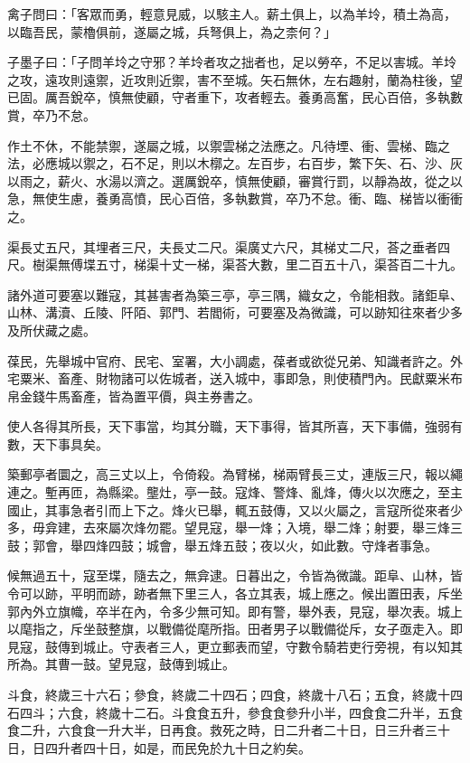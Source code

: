 
\begin{pinyinscope}
禽子問曰：「客眾而勇，輕意見威，以駭主人。薪土俱上，以為羊坽，積土為高，以臨吾民，蒙櫓俱前，遂屬之城，兵弩俱上，為之柰何？」

子墨子曰：「子問羊坽之守邪？羊坽者攻之拙者也，足以勞卒，不足以害城。羊坽之攻，遠攻則遠禦，近攻則近禦，害不至城。矢石無休，左右趣射，蘭為柱後，望已固。厲吾銳卒，慎無使顧，守者重下，攻者輕去。養勇高奮，民心百倍，多執數賞，卒乃不怠。

作土不休，不能禁禦，遂屬之城，以禦雲梯之法應之。凡待堙、衝、雲梯、臨之法，必應城以禦之，石不足，則以木槨之。左百步，右百步，繁下矢、石、沙、灰以雨之，薪火、水湯以濟之。選厲銳卒，慎無使顧，審賞行罰，以靜為故，從之以急，無使生慮，養勇高憤，民心百倍，多執數賞，卒乃不怠。衝、臨、梯皆以衝衝之。

渠長丈五尺，其埋者三尺，夫長丈二尺。渠廣丈六尺，其梯丈二尺，荅之垂者四尺。樹渠無傅堞五寸，梯渠十丈一梯，渠荅大數，里二百五十八，渠荅百二十九。

諸外道可要塞以難寇，其甚害者為築三亭，亭三隅，織女之，令能相救。諸鉅阜、山林、溝瀆、丘陵、阡陌、郭門、若閻術，可要塞及為微識，可以跡知往來者少多及所伏藏之處。

葆民，先舉城中官府、民宅、室署，大小調處，葆者或欲從兄弟、知識者許之。外宅粟米、畜產、財物諸可以佐城者，送入城中，事即急，則使積門內。民獻粟米布帛金錢牛馬畜產，皆為置平價，與主券書之。

使人各得其所長，天下事當，均其分職，天下事得，皆其所喜，天下事備，強弱有數，天下事具矣。

築郵亭者圜之，高三丈以上，令倚殺。為臂梯，梯兩臂長三丈，連版三尺，報以繩連之。塹再匝，為縣梁。壟灶，亭一鼓。寇烽、警烽、亂烽，傳火以次應之，至主國止，其事急者引而上下之。烽火已舉，輒五鼓傳，又以火屬之，言寇所從來者少多，毋弇建，去來屬次烽勿罷。望見寇，舉一烽；入境，舉二烽；射要，舉三烽三鼓；郭會，舉四烽四鼓；城會，舉五烽五鼓；夜以火，如此數。守烽者事急。

候無過五十，寇至堞，隨去之，無弇逮。日暮出之，令皆為微識。距阜、山林，皆令可以跡，平明而跡，跡者無下里三人，各立其表，城上應之。候出置田表，斥坐郭內外立旗幟，卒半在內，令多少無可知。即有警，舉外表，見寇，舉次表。城上以麾指之，斥坐鼓整旗，以戰備從麾所指。田者男子以戰備從斥，女子亟走入。即見寇，鼓傳到城止。守表者三人，更立郵表而望，守數令騎若吏行旁視，有以知其所為。其曹一鼓。望見寇，鼓傳到城止。

斗食，終歲三十六石；參食，終歲二十四石；四食，終歲十八石；五食，終歲十四石四斗；六食，終歲十二石。斗食食五升，參食食參升小半，四食食二升半，五食食二升，六食食一升大半，日再食。救死之時，日二升者二十日，日三升者三十日，日四升者四十日，如是，而民免於九十日之約矣。


\end{pinyinscope}
